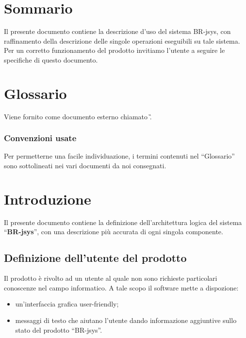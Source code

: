 \tableofcontents 
\chapter*{Sommario}
Il presente documento contiene la descrizione d'uso del sistema BR-jsys, con raffinamento della descrizione delle singole operazioni eseguibili su tale sistema. Per un corretto funzionamento del prodotto invitiamo l'utente a seguire le specifiche di questo documento.

\chapter*{Glossario}
Viene fornito come documento esterno chiamato \G. 
\subsection{Convenzioni usate}
Per permetterne una facile individuazione, i termini contenuti nel ``Glossario'' sono sottolineati nei vari documenti da noi consegnati.

\chapter{Introduzione}
Il presente documento contiene la definizione dell'architettura logica del sistema ``\textbf{BR-jsys}'', con una descrizione pi\`u accurata di ogni singola componente.
\section{Definizione dell'utente del prodotto}
Il prodotto \`e rivolto ad un utente al quale non sono richieste particolari conoscenze nel campo informatico. A tale scopo il software mette a dispozione:
\begin{itemize}
\item un'interfaccia grafica user-friendly;
\item messaggi di testo che aiutano l'utente dando informazione aggiuntive sullo stato del prodotto ``BR-jsys''.
\end{itemize}
